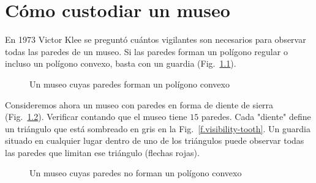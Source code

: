 
\chapter{Cómo custodiar un museo}\label{c.museum}


En 1973 Victor Klee se preguntó cuántos vigilantes son necesarios para observar todas las paredes de un museo. Si las paredes forman un polígono regular o incluso un polígono convexo, basta con un guardia (Fig.~\ref{f.museum.convex}).
\begin{figure}[ht]
\begin{center}
\end{center}
\caption{Un museo cuyas paredes forman un polígono convexo}\label{f.museum.convex}
\end{figure}

Consideremos ahora un museo con paredes en forma de diente de sierra (Fig.~\ref{f.museum.nonconvex}). Verificar contando que el museo tiene $15$ paredes. Cada "diente" define un triángulo que está sombreado en gris en la Fig.~\ref{f.visibility-tooth}. Un guardia situado en cualquier lugar dentro de uno de los triángulos puede observar todas las paredes que limitan ese triángulo (flechas rojas).
\begin{figure}[b]
\begin{center}
\end{center}
\caption{Un museo cuyas paredes no forman un polígono convexo}\label{f.museum.nonconvex}
\end{figure}

